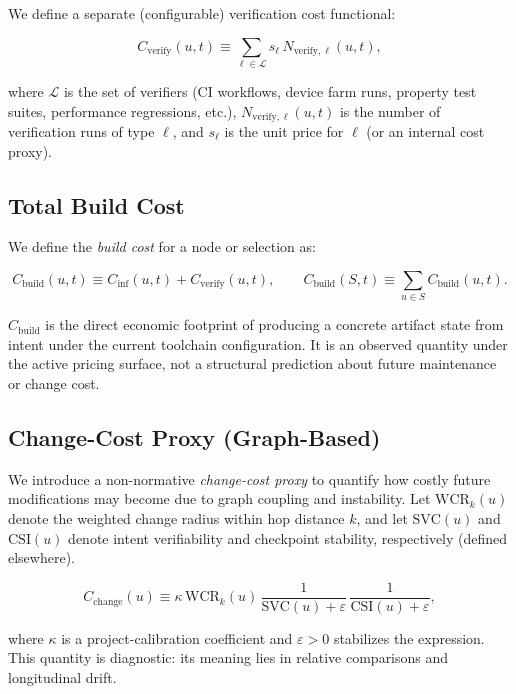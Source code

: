 \documentclass{aastex701}
\begin{document}
We define a separate (configurable) verification cost functional:

\begin{equation}
C_{\mathrm{verify}}(u,t) \equiv
\sum_{\ell \in \mathcal{L}} s_\ell\,N_{\mathrm{verify},\ell}(u,t),
\end{equation}

where $\mathcal{L}$ is the set of verifiers (CI workflows, device farm runs,
property test suites, performance regressions, etc.),
$N_{\mathrm{verify},\ell}(u,t)$ is the number of verification runs of type $\ell$,
and $s_\ell$ is the unit price for $\ell$ (or an internal cost proxy).

\subsection{Total Build Cost}

We define the \emph{build cost} for a node or selection as:

\begin{equation}
C_{\mathrm{build}}(u,t) \equiv C_{\mathrm{inf}}(u,t) + C_{\mathrm{verify}}(u,t),
\qquad
C_{\mathrm{build}}(S,t) \equiv \sum_{u \in S} C_{\mathrm{build}}(u,t).
\end{equation}

$C_{\mathrm{build}}$ is the direct economic footprint of producing a concrete
artifact state from intent under the current toolchain configuration.
It is an observed quantity under the active pricing surface, not a structural
prediction about future maintenance or change cost.

\subsection{Change-Cost Proxy (Graph-Based)}

We introduce a non-normative \emph{change-cost proxy} to quantify how costly
future modifications may become due to graph coupling and instability.
Let $\mathrm{WCR}_k(u)$ denote the weighted change radius within hop distance $k$,
and let $\mathrm{SVC}(u)$ and $\mathrm{CSI}(u)$ denote intent verifiability and
checkpoint stability, respectively (defined elsewhere).

\begin{equation}
C_{\mathrm{change}}(u) \equiv
\kappa\,\mathrm{WCR}_k(u)\,
\frac{1}{\mathrm{SVC}(u)+\varepsilon}\,
\frac{1}{\mathrm{CSI}(u)+\varepsilon},
\end{equation}

where $\kappa$ is a project-calibration coefficient and $\varepsilon>0$ stabilizes
the expression. This quantity is diagnostic: its meaning lies in relative
comparisons and longitudinal drift.
\end{document}
